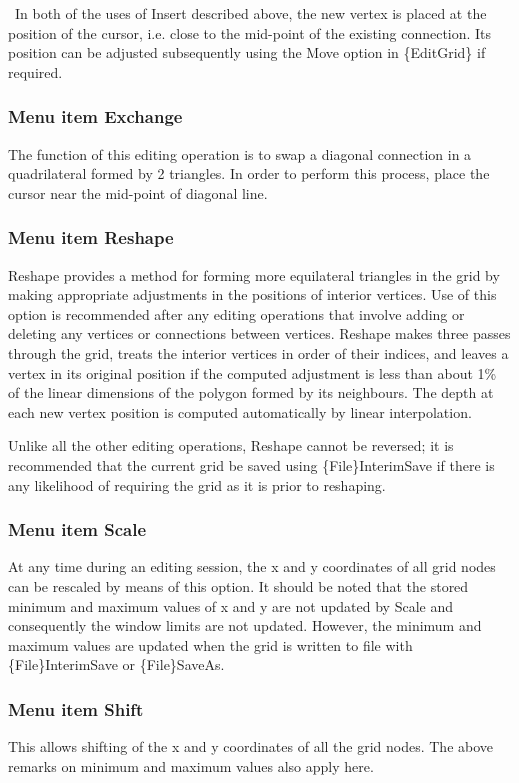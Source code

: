 \documentclass{article}
\begin{document}
\ In both of the uses of Insert described above, the new vertex is placed at the position of the cursor, i.e. close to the mid-point of the existing connection. Its position can be adjusted subsequently using the Move option in \{EditGrid\} if required.

\subsubsection[Menu item Exchange]{Menu item Exchange}
The function of this editing operation is to swap a diagonal connection in a quadrilateral formed by 2 triangles. In order to perform this process, place the cursor near the mid-point of diagonal line.

\subsubsection[Menu item Reshape]{Menu item Reshape}
Reshape provides a method for forming more equilateral triangles in the grid by making appropriate adjustments in the positions of interior vertices. Use of this option is recommended after any editing operations that involve adding or deleting any vertices or connections between vertices. Reshape makes three passes through the grid, treats the interior vertices in order of their indices, and leaves a vertex in its original position if the computed adjustment is less than about 1\% of the linear dimensions of the polygon formed by its neighbours. The depth at each new vertex position is computed automatically by linear interpolation.

Unlike all the other editing operations, Reshape cannot be reversed; it is recommended that the current grid be saved using \{File\}InterimSave if there is any likelihood of requiring the grid as it is prior to reshaping.

\subsubsection[Menu item Scale]{Menu item Scale}
At any time during an editing session, the x and y coordinates of all grid nodes can be rescaled by means of this option. It should be noted that the stored minimum and maximum values of x and y are not updated by Scale and consequently the window limits are not updated. However, the minimum and maximum values are updated when the grid is written to file with \{File\}InterimSave or \{File\}SaveAs.

\subsubsection[Menu item Shift]{Menu item Shift}
This allows shifting of the x and y coordinates of all the grid nodes. The above remarks on minimum and maximum values also apply here.
\end{document}
